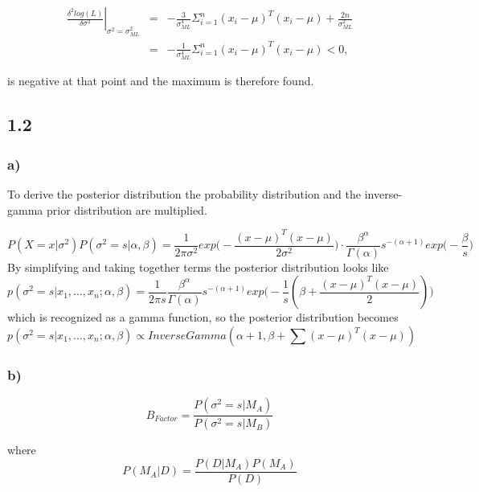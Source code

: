 \documentclass{article}
\begin{document}
\begin{equation}
\begin{array}{rcl}
\left.\frac{\delta^2 log(L)}{\delta\sigma^2}\right|_{\sigma^2=\sigma_{ML}^2} & = & -\frac{3}{\sigma^4_{ML}}\Sigma_{i=1}^{n}(x_i-\mu)^T(x_i-\mu)+\frac{2n}{\sigma^2_{ML}}\\
& = & -\frac{1}{\sigma^4_{ML}}\Sigma_{i=1}^{n}(x_i-\mu)^T(x_i-\mu) < 0,
\end{array}
\end{equation}

is negative at that point and the maximum is therefore found.

\subsection*{1.2}

\subsubsection*{a)}
To derive the posterior distribution the probability distribution and the inverse-gamma prior distribution are multiplied. 

$$ P(X =x|\sigma^2) P(\sigma^2=s|\alpha , \beta) = \frac{1}{2\pi \sigma^2} exp\Big(-\frac{(x - \mu)^T(x-\mu)}{2\sigma^2}\Big)\cdot \frac{\beta^{\alpha}}{\Gamma(\alpha)}s^{-(\alpha+1)}exp\Big(-\frac{\beta}{s}\Big) $$
\noindent By simplifying and taking together terms the posterior distribution looks like
$$p(\sigma^2 = s|x_1,...,x_n;\alpha,\beta) = \frac{1}{2\pi s}\frac{\beta^{\alpha}}{\Gamma({\alpha})}s^{-(\alpha + 1)}exp\Big(-\frac{1}{s}(\beta+\frac{(x-\mu)^T(x-\mu)}{2})\Big) $$
\noindent which is recognized as a gamma function, so the posterior distribution becomes
\begin{equation}
p(\sigma^2=s|x_1,...,x_n;\alpha,\beta) \propto InverseGamma(\alpha+1, \beta + \sum(x-\mu)^{T}(x-\mu))
\end{equation}

\subsubsection*{b)}

\begin{equation}
B_{Factor}=\frac{P(\sigma^2=s|M_A)}{P(\sigma^2=s|M_B)}
\end{equation}

where
\begin{equation}
P(M_A|D)=\frac{P(D|M_A)P(M_A)}{P(D)}
\end{equation}
\end{document}
